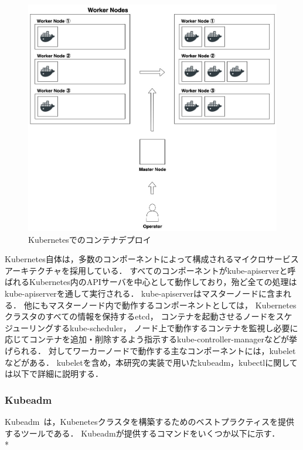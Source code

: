 \begin{figure}[htbp]
\begin{center}
    \includegraphics[width=\textwidth]{./figures/k8s-deploy-container.jpg}
    \caption{Kubernetesでのコンテナデプロイ}
\end{center}
\end{figure}

Kubernetes自体は，多数のコンポーネントによって構成されるマイクロサービスアーキテクチャを採用している．
すべてのコンポーネントがkube-apiserverと呼ばれるKubernetes内のAPIサーバを中心として動作しており，殆ど全ての処理はkube-apiserverを通して実行される．
kube-apiserverはマスターノードに含まれる．
他にもマスターノード内で動作するコンポーネントとしては，
Kubernetesクラスタのすべての情報を保持するetcd，
コンテナを起動させるノードをスケジューリングするkube-scheduler，
ノード上で動作するコンテナを監視し必要に応じてコンテナを追加・削除するよう指示するkube-controller-managerなどが挙げられる．
対してワーカーノードで動作する主なコンポーネントには，kubeletなどがある．
kubeletを含め，本研究の実装で用いたkubeadm，kubectlに関しては以下で詳細に説明する．

\subsubsection{Kubeadm}
\label{background:container-orchestration-system:kubernetes:kubeadm}

Kubeadm~\cite{Kubeadm}は，Kubenetesクラスタを構築するためのベストプラクティスを提供するツールである．
Kubeadmが提供するコマンドをいくつか以下に示す．\\*


